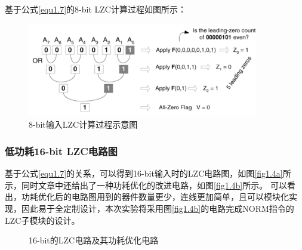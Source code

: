 基于公式\ref{equ1.7}的8-bit LZC计算过程如图所示：
\begin{figure}[!hbtp]
\centering
\includegraphics[width = 0.9\textwidth]{chapter1/LZC8bit}
\caption{8-bit输入LZC计算过程示意图}
\label{fig1.3}
\end{figure}
\subsubsection{低功耗16-bit LZC电路图}
基于公式\ref{equ1.7}的关系，可以得到16-bit输入时的LZC电路图，如图\ref{fig1.4a}所示，同时文章中还给出了一种功耗优化的改进电路，如图\ref{fig1.4b}所示。{\color{red} 可以看出，功耗优化后的电路图用到的器件数量更少，连线更加简单，且可以模块化实现，因此易于全定制设计，本次实验将采用图\ref{fig1.4b}的电路完成NORM指令的LZC子模块的设计。}
\begin{figure}[!hbtp]
\centering
{}
\caption{16-bit的LZC电路及其功耗优化电路}
\label{fig1.4}
\end{figure}


